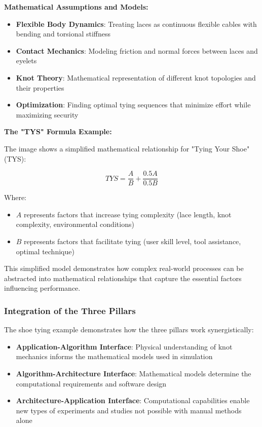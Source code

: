 \textbf{Mathematical Assumptions and Models:}
\begin{itemize}
    \item \textbf{Flexible Body Dynamics}: Treating laces as continuous flexible cables with bending and torsional stiffness
    \item \textbf{Contact Mechanics}: Modeling friction and normal forces between laces and eyelets
    \item \textbf{Knot Theory}: Mathematical representation of different knot topologies and their properties
    \item \textbf{Optimization}: Finding optimal tying sequences that minimize effort while maximizing security
\end{itemize}

\textbf{The "TYS" Formula Example:}

The image shows a simplified mathematical relationship for "Tying Your Shoe" (TYS):

\begin{equation}
TYS = \frac{A}{B} + \frac{0.5A}{0.5B}
\end{equation}

Where:
\begin{itemize}
    \item $A$ represents factors that increase tying complexity (lace length, knot complexity, environmental conditions)
    \item $B$ represents factors that facilitate tying (user skill level, tool assistance, optimal technique)
\end{itemize}

This simplified model demonstrates how complex real-world processes can be abstracted into mathematical relationships that capture the essential factors influencing performance.

\subsubsection{Integration of the Three Pillars}

The shoe tying example demonstrates how the three pillars work synergistically:

\begin{itemize}
    \item \textbf{Application-Algorithm Interface}: Physical understanding of knot mechanics informs the mathematical models used in simulation
    \item \textbf{Algorithm-Architecture Interface}: Mathematical models determine the computational requirements and software design
    \item \textbf{Architecture-Application Interface}: Computational capabilities enable new types of experiments and studies not possible with manual methods alone
\end{itemize}

